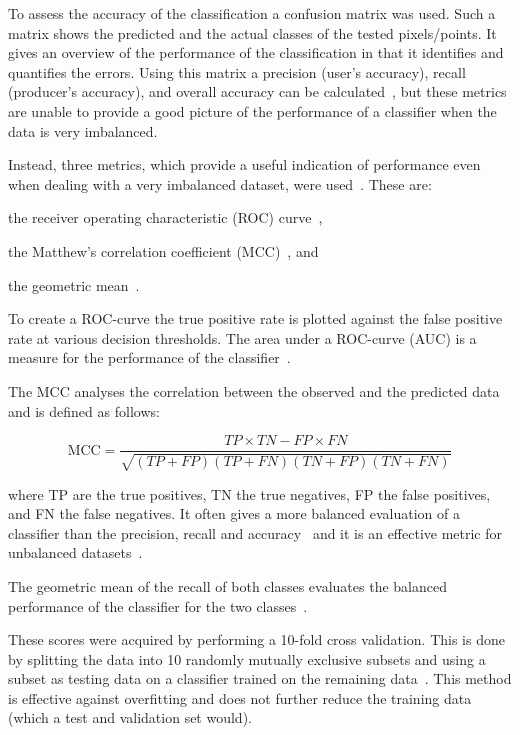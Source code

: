 {To assess the accuracy of the classification a confusion matrix was used. Such a matrix shows the predicted and the actual classes of the tested pixels/points. It gives an overview of the performance of the classification in that it identifies and quantifies the errors. Using this matrix a precision (user's accuracy), recall (producer's accuracy), and overall accuracy can be calculated~\citep{stehman1997selecting}, but these metrics are unable to provide a good picture of the performance of a classifier when the data is very imbalanced.

Instead, three metrics, which provide a useful indication of performance even when dealing with a very imbalanced dataset, were used~\citep{sun2009classification, lopez2013insight}. These are:
\begin{enumerate*}[(i)]
	\item the receiver operating characteristic (ROC) curve~\citep{bradley1997use},
	\item the Matthew's correlation coefficient (MCC)~\citep{matthews1975comparison}, and
	\item the geometric mean~\citep{kubat1998machine}.
\end{enumerate*}

To create a ROC-curve the true positive rate is plotted against the false positive rate at various decision thresholds. The area under a ROC-curve (AUC) is a measure for the performance of the classifier~\citep{bradley1997use}.

The MCC analyses the correlation between the observed and the predicted data and is defined as follows:

\begin{equation}
	\label{eq:MCC}
	{\text{MCC}}={\frac  {TP\times TN-FP\times FN}{{\sqrt  {(TP+FP)(TP+FN)(TN+FP)(TN+FN)}}}}
\end{equation}

where TP are the true positives, TN the true negatives, FP the false positives, and FN the false negatives. It often gives a more balanced evaluation of a classifier than the precision, recall and accuracy~\citep{baldi2000assessing} and it is an effective metric for unbalanced datasets~\citep{kohavi1995study}.

The geometric mean of the recall of both classes evaluates the balanced performance of the classifier for the two classes~\citep{kubat1998machine, sun2009classification}.

These scores were acquired by performing a 10-fold cross validation. This is done by splitting the data into 10 randomly mutually exclusive subsets and using a subset as testing data on a classifier trained on the remaining data~\citep{kohavi1995study}. This method is effective against overfitting and does not further reduce the training data (which a test and validation set would).

}
